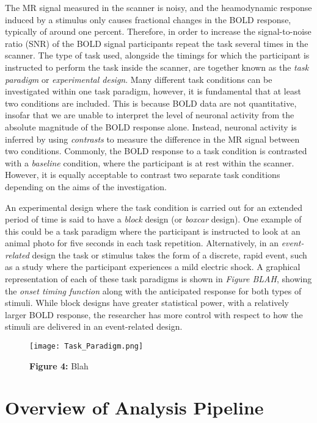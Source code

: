 The MR signal measured in the scanner is noisy, and the heamodynamic response induced by a stimulus only causes fractional changes in the BOLD response, typically of around one percent. Therefore, in order to increase the signal-to-noise ratio (SNR) of the BOLD signal participants repeat the task several times in the scanner. The type of task used, alongside the timings for which the participant is instructed to perform the task inside the scanner, are together known as the \textit{task paradigm} or \textit{experimental design}. Many different task conditions can be investigated within one task paradigm, however, it is fundamental that at least two conditions are included. This is because BOLD data are not quantitative, insofar that we are unable to interpret the level of neuronal activity from the absolute magnitude of the BOLD response alone. Instead, neuronal activity is inferred by using \textit{contrasts} to measure the difference in the MR signal between two conditions. Commonly, the BOLD response to a task condition is contrasted with a \textit{baseline} condition, where the participant is at rest within the scanner. However, it is equally acceptable to contrast two separate task conditions depending on the aims of the investigation. 

An experimental design where the task condition is carried out for an extended period of time is said to have a \textit{block} design (or \textit{boxcar} design). One example of this could be a task paradigm where the participant is instructed to look at an animal photo for five seconds in each task repetition. Alternatively, in an \textit{event-related} design the task or stimulus takes the form of a discrete, rapid event, such as a study where the participant experiences a mild electric shock. A graphical representation of each of these task paradigms is shown in \textit{Figure BLAH}, showing the \textit{onset timing function} along with the anticipated response for both types of stimuli. While block designs have greater statistical power, with a relatively larger BOLD response, the researcher has more control with respect to how the stimuli are delivered in an event-related design. 

\begin{figure}[htbp]
\centering
	\texttt{[image: Task\_Paradigm.png]}
\caption*{\textbf{Figure 4:} Blah}
\end{figure}

\section{Overview of Analysis Pipeline}

